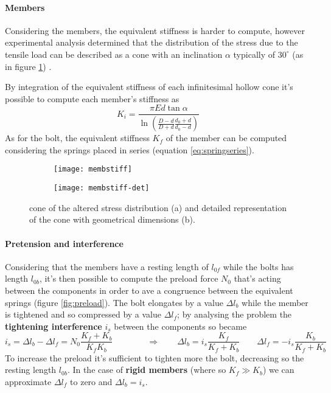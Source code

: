 	\paragraph{Members} Considering the members, the equivalent stiffness is harder to compute, however experimental analysis determined that the distribution of the stress due to the tensile load can be described as a cone with an inclination $\alpha$ typically of $30^\circ$ (as in figure \ref{fig:memberstiff})	.
	
	By integration of the equivalent stiffness of each infinitesimal hollow cone it's possible to compute each member's stiffness as
	\begin{equation} \label{eq:conicalstiffness}
		K_i = \frac{\pi E d \tan \alpha}{\ln \left( \frac{D-d}{D+d} \frac{d_0+d}{d_0-d} \right)}
	\end{equation}
	As for the bolt, the equivalent stiffness $K_f$ of the member can be computed considering the springs placed in series (equation \ref{eq:springseries}).
	\begin{figure}[bht]
		\centering
		\begin{subfigure}{0.48\linewidth}
			\centering \texttt{[image: membstiff]} \caption{} 
		\end{subfigure}
		\begin{subfigure}{0.48\linewidth}
			\centering \texttt{[image: membstiff-det]} \caption{} 
		\end{subfigure}
		\caption{cone of the altered stress distribution (a) and detailed representation of the cone with geometrical dimensions (b). } \label{fig:memberstiff}
	\end{figure}
	
	
	\paragraph{Pretension and interference} Considering that the members have a resting length of $l_{0f}$ while the bolts has length $l_{0b}$, it's then possible to compute the preload force $N_0$ that's acting between the components in order to ave a congruence between the equivalent springs (figure \ref{fig:preload}). The bolt elongates by a value $\Delta l_b$ while the member is tightened and so compressed by a value $\Delta l_f$; by analysing the problem the \textbf{tightening interference} $i_s$ between the components so became
	\begin{equation}
		i_s = \Delta l_b - \Delta l_f = N_0 \frac{K_f + K_b}{K_fK_b} \qquad \qquad \Rightarrow \qquad \Delta l_b = i_s \frac{K_f}{K_f + K_b} \qquad \Delta l_f = - i_s\frac{K_b}{K_f+K_b}
	\end{equation}
	To increase the preload it's sufficient to tighten more the bolt, decreasing so the resting length $l_{0b}$. In the case of \textbf{rigid members} (where so $K_f \gg K_b$) we can approximate $\Delta l_f$ to zero and $\Delta l_b = i_s$.
	
